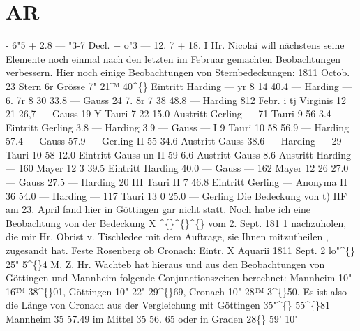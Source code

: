 \documentclass[12pt,a4paper]{article}
\newcommand{\degree}{\textdegree}
\begin{document}
\section*{AR}
-  6"5 
+     2.8 
---  "3-7 
Decl. 
+  o"3 
---  12.  7 
+  18.  I 
Hr.  Nicolai  will  nächstens  seine  Elemente  noch  einmal  nach  den  letzten  im  Februar  gemachten 
Beobachtungen  verbessern. 
Hier  noch  einige  Beobachtungen  von  Sternbedeckungen: 
1811  Octob.  23  Stern  6r  Grösse     7"  21™  40\textasciicircum\{\}  Eintritt  Harding 
---           yr 
8 
14    40.4         ---       Harding 
---              6.  7r 
8 
30    33.8         ---       Gauss 
24              7.  8r 
7 38    48.8         ---       Harding 
812     Febr.     i  tj  Virginis 
12 
21    26,7         ---       Gauss 
19  Y   Tauri 
7 22    15.0  Austritt  Gerling 
---  71  Tauri 
9 56      3.4  Eintritt  Gerling 
3.8  ---       Harding 
3.9  ---       Gauss 
---  I  9  Tauri 
10 
58    56.9         ---       Harding 
57.4        ---      Gauss 
57.9        ---       Gerling 
II 
55    34.6  Austritt  Gauss 
38.6        ---       Harding 
---  29  Tauri 
10 
58    12.0  Eintritt  Gauss  un 
II 
59      6.6  Austritt  Gauss 
8.6  Austritt  Harding 
---  160  Mayer 
12 
3    39.5  Eintritt  Harding 
40.0        ---       Gauss 
---  162  Mayer 
12 
26    27.0        ---       Gauss 
27.5         ---       Harding 
20  III  Tauri 
II 
7    46.8  Eintritt  Gerling 
---  Anonyma 
II 
36    54.0        ---       Harding 
---  117  Tauri 
13 
0    25.0        ---       Gerling 
Die  Bedeckung  von  t)  HF  am  23.  April  fand  hier  in  Göttingen  gar  nicht  statt. 
Noch  habe  ich  eine  Beobachtung  von  der  Bedeckung  X  \textasciicircum\{\}\textasciicircum\{\}\textasciicircum\{\}   vom   2.  Sept.  181 1   nachzuholen,    die 
mir  Hr.  Obrist  v.  Tischledee  mit  dem  Auftrage,  sie  Ihnen  mitzutheilen ,  zugesandt  hat. 
Feste  Rosenberg  ob  Cronach:  Eintr.  X  Aquarii  1811  Sept.  2  lo"\textasciicircum\{\}  25"  5\textasciicircum\{\}4  M.  Z. 
Hr.  Wachteb  hat  hieraus   und  aus    den  Beobachtungen   von  Göttingen   und  Mannheim  folgende 
Conjunctionszeiten  berechnet:  Mannheim  10"  16™  38\textasciicircum\{\}01,  Göttingen  10"  22"  29\textasciicircum\{\}69,  Cronach  10"  28™  3\textasciicircum\{\}50. 
Es  ist  also  die  Länge  von  Cronach  aus  der  Vergleichung  mit 
Göttingen     35"\textasciicircum\{\}  55\textasciicircum\{\}81 
Mannheim    35     57.49 
im  Mittel    35     56.  65  oder  in  Graden  28\degree\{\}  59'  10" 
\end{document}
